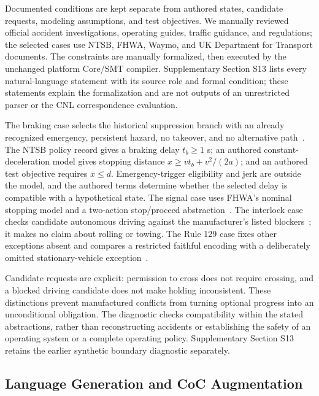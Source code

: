 Documented conditions are kept separate from authored states, candidate
requests, modeling assumptions, and test objectives. We manually reviewed
official accident investigations, operating guides, traffic guidance, and
regulations; the selected cases use NTSB, FHWA, Waymo, and UK Department for
Transport documents. The constraints are manually formalized, then executed
by the unchanged platform Core/SMT compiler. Supplementary Section S13 lists every natural-language statement
with its source role and formal condition; these statements explain the
formalization and are not outputs of an unrestricted parser or the CNL
correspondence evaluation.

The braking case selects the historical suppression branch with an already
recognized emergency, persistent hazard, no takeover, and no alternative
path~\cite{NTSB2019Tempe}. The NTSB policy record gives a braking delay
$t_b\ge1$ s; an authored constant-deceleration model gives stopping distance
$x\ge vt_b+v^2/(2a)$; and an authored test objective requires $x\le d$.
Emergency-trigger eligibility and jerk are outside the model, and the
authored terms determine whether the selected delay is compatible with a
hypothetical state. The signal case uses FHWA's nominal stopping
model and a two-action stop/proceed abstraction~\cite{FHWA2009Yellow,FHWA2008Timing}.
The interlock case checks candidate autonomous driving against the
manufacturer's listed blockers~\cite{Waymo2026Emergency}; it makes no claim
about rolling or towing. The Rule 129 case fixes other exceptions absent
and compares a restricted faithful encoding with a deliberately omitted
stationary-vehicle exception~\cite{DfT2015HighwayCode129}.

Candidate requests are explicit: permission to cross does not require
crossing, and a blocked driving candidate does not make holding inconsistent.
These distinctions prevent manufactured conflicts from turning optional
progress into an unconditional obligation. The diagnostic checks
compatibility within the stated abstractions, rather than reconstructing
accidents or establishing the safety of an operating system or a complete
operating policy. Supplementary Section S13 retains the earlier synthetic
boundary diagnostic separately.

\subsection{Language Generation and CoC Augmentation}\label{sec:method-cnl}

